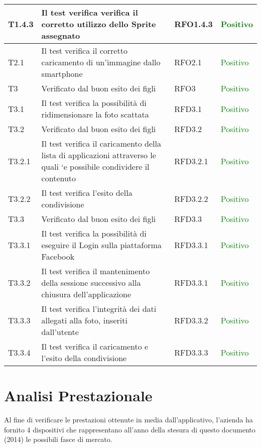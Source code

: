 \begin{center}
\begin{longtable}{ | p{2cm} | p{6cm} | p{2cm} | p{2cm} |}
    T1.4.3&Il test verifica verifica il corretto utilizzo dello Sprite assegnato &RFO1.4.3& \textcolor{green}{Positivo}\\ \hline 
    T2.1&Il test verifica il corretto caricamento di un'immagine dallo smartphone &RFO2.1  & \textcolor{green}{Positivo}\\ \hline 
    T3& Verificato dal buon esito dei figli &RFO3 & \textcolor{green}{Positivo}\\ \hline 
    T3.1& Il test verifica la possibilità di ridimensionare la foto scattata &RFD3.1 & \textcolor{green}{Positivo}\\ \hline 
    T3.2& Verificato dal buon esito dei figli &RFD3.2  & \textcolor{green}{Positivo}\\ \hline 
    T3.2.1&Il test verifica il caricamento della lista di applicazioni attraverso le quali
`e possibile condividere il contenuto &RFD3.2.1  & \textcolor{green}{Positivo}\\ \hline 
    T3.2.2&Il test verifica l'esito della condivisione&RFD3.2.2  & \textcolor{green}{Positivo}\\ \hline 
    T3.3& Verificato dal buon esito dei figli &RFD3.3  & \textcolor{green}{Positivo}\\ \hline 
    T3.3.1& Il test verifica la possibilità di eseguire il Login sulla piattaforma Facebook &RFD3.3.1  & \textcolor{green}{Positivo}\\ \hline 
    T3.3.2&Il test verifica il mantenimento della sessione successivo alla chiusura
dell'applicazione &RFD3.3.1  & \textcolor{green}{Positivo}\\ \hline 
    T3.3.3& Il test verifica l'integrità dei dati allegati alla foto, inseriti dall'utente &RFD3.3.2  & \textcolor{green}{Positivo}\\ \hline 
    T3.3.4& Il test verifica il caricamento e l'esito della condivisione&RFD3.3.3  & \textcolor{green}{Positivo}\\ \hline 
    \end{longtable}
\end{center}


\section{Analisi Prestazionale}

Al fine di verificare le prestazioni ottenute in media dall'applicativo, l'azienda ha fornito 4 dispositivi che rappresentano all'anno della stesura di questo documento (2014) le possibili fasce di mercato.


